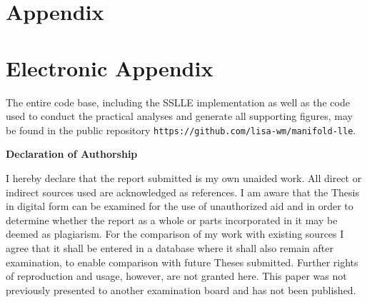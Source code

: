 \documentclass[12pt, t]{article}
\begin{document}
\appendix

\section{Appendix}
\label{app}

\newpage

\section{Electronic Appendix}
\label{el_app}

The entire code base, including the SSLLE implementation as well as the code 
used to conduct the practical analyses and generate all supporting figures, may 
be found in the public repository 
\texttt{https://github.com/lisa-wm/manifold-lle}.

\newpage
    

\RaggedRight


\newpage


\Large
\noindent
\textbf{Declaration of Authorship} 
\vspace{0.5cm}
\noindent
\normalsize

I hereby declare that the report submitted is my own unaided work. All direct or 
indirect sources used are acknowledged as references. I am aware that the Thesis 
in digital form can be examined for the use of unauthorized aid and in order to 
determine whether the report as a whole or parts incorporated in it may be 
deemed as plagiarism. For the comparison of my work with existing sources I 
agree that it shall be entered in a database where it shall also remain after 
examination, to enable comparison with future Theses submitted. Further rights 
of reproduction and usage, however, are not granted here. This paper was not 
previously presented to another examination board and has not been published. 

\end{document}
